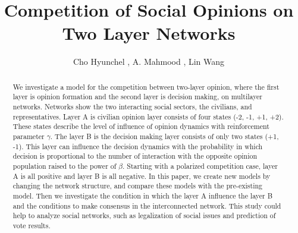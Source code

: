 \documentclass[english]{cccconf}
\begin{document}
\title{Competition of Social Opinions on Two Layer Networks}


\author{Cho Hyunchel ,
        A. Mahmood ,
        Lin Wang }

\maketitle

\begin{abstract}
We investigate a model for the competition between two-layer opinion, where the first layer is opinion formation and the second layer is decision making, on multilayer networks. Networks show the two interacting social sectors, the civilians, and representatives. Layer A is civilian opinion layer consists of four states (-2, -1, +1, +2). These states describe the level of influence of opinion dynamics with reinforcement parameter $\gamma$. The layer B is the decision making layer consists of only two states (+1, -1).  This layer can influence the decision dynamics with the probability in which decision is proportional to the number of interaction with the opposite opinion population raised to the power of $\beta$. Starting with a polarized competition case, layer A is all positive and layer B is all negative. In this paper, we create new models by changing the network structure, and compare these models with the pre-existing model. Then we investigate the condition in which the layer A influence the layer B and the conditions to make consensus in the interconnected network. This study could help to analyze social networks, such as legalization of social issues and prediction of vote results.
\end{abstract}
\end{document}
